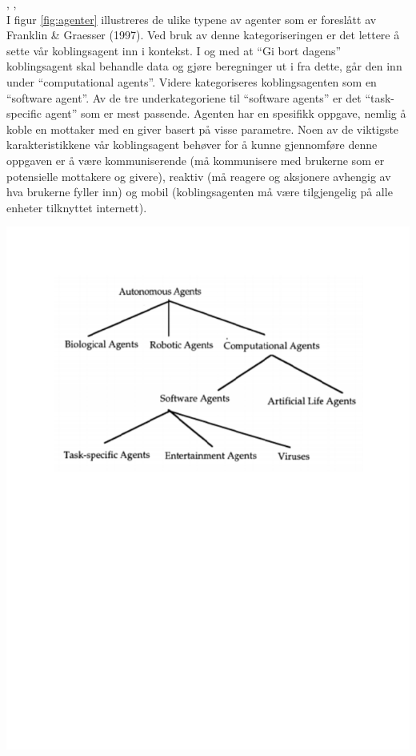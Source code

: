 \citep{agent}, \citep{schermer}, \citep{nwana}\\

I figur \ref{fig:agenter} illustreres de ulike typene av agenter som er foreslått av Franklin \& Graesser (1997). Ved bruk av denne kategoriseringen er det lettere å sette vår koblingsagent inn i kontekst. I og med at ``Gi bort dagens'' koblingsagent skal behandle data og gjøre beregninger ut i fra dette, går den inn under ``computational agents''. Videre kategoriseres koblingsagenten som en ``software agent''. Av de tre underkategoriene til ``software agents'' er det ``task-specific agent'' som er mest passende. Agenten har en spesifikk oppgave, nemlig å koble en mottaker med en giver basert på visse parametre. Noen av de viktigste karakteristikkene vår koblingsagent behøver for å kunne gjennomføre denne oppgaven er å være kommuniserende (må kommunisere med brukerne som er potensielle mottakere og givere), reaktiv (må reagere og aksjonere avhengig av hva brukerne fyller inn) og mobil (koblingsagenten må være tilgjengelig på alle enheter tilknyttet internett).


\begin{center}
\includegraphics[clip=true, width=1 \textwidth,
trim=0cm 14cm 0cm 1.5cm]{agenter.pdf}
\label{fig:agenter}
\end{center}
